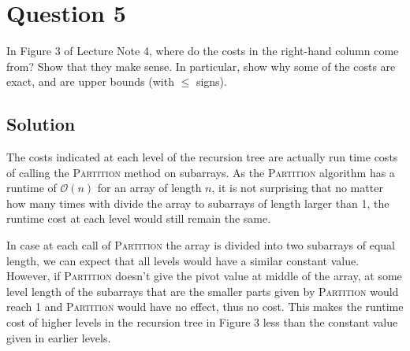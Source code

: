
\section*{Question 5}

In Figure 3 of Lecture Note 4, where do the costs in the right-hand column come from? Show that they make sense.
In particular, show why some of the costs are exact, and are upper bounds (with $\leq$ signs).

\subsection*{Solution}

The costs indicated at each level of the recursion tree are actually run time costs of calling the \textsc{Partition} method on subarrays.
As the \textsc{Partition} algorithm has a runtime of $\mathcal{O}(n)$ for an array of length $n$, it is not surprising that no matter how many times with divide the array to subarrays of length larger than 1, the runtime cost at each level would still remain the same.

In case at each call of \textsc{Partition} the array is divided into two subarrays of equal length, we can expect that all levels would have a similar constant value.
However, if \textsc{Partition} doesn't give the pivot value at middle of the array, at some level length of the subarrays that are the smaller parts given by \textsc{Partition} would reach 1 and \textsc{Partition} would have no effect, thus no cost.
This makes the runtime cost of higher levels in the recursion tree in Figure 3 less than the constant value given in earlier levels.
